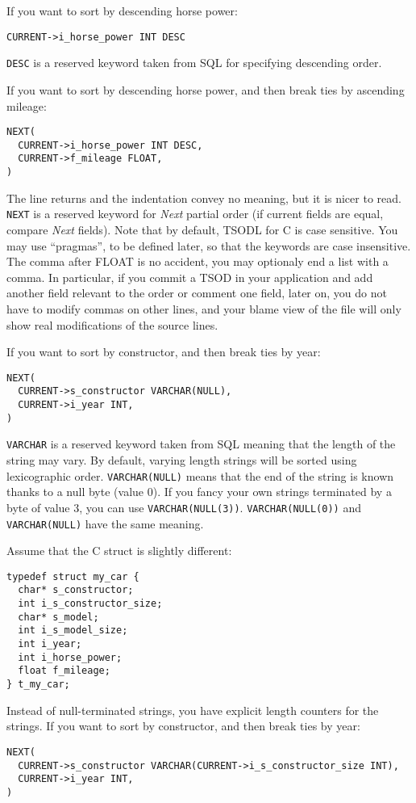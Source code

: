 \documentclass[a4paper,11pt]{report}
\begin{document}
If you want to sort by descending horse power:
\begin{verbatim}
CURRENT->i_horse_power INT DESC
\end{verbatim}
\verb?DESC? is a reserved keyword taken from SQL for specifying descending order.

If you want to sort by descending horse power, and then break ties by ascending mileage:
\begin{verbatim}
NEXT(
  CURRENT->i_horse_power INT DESC,
  CURRENT->f_mileage FLOAT,
)
\end{verbatim}
The line returns and the indentation convey no meaning,
but it is nicer to read.
\verb?NEXT? is a reserved keyword for \emph{Next} partial order (if current fields are equal, compare \emph{Next} fields).
Note that by default, TSODL for C is case sensitive.
You may use ``pragmas'', to be defined later, so that the keywords are case insensitive.
The comma after FLOAT is no accident, you may optionaly end a list with a comma.
In particular, if you commit a TSOD in your application and add another field
relevant to the order or comment one field, later on, you do not have to modify commas on other lines,
and your blame view of the file will only show real modifications of the source lines.

If you want to sort by constructor, and then break ties by year:
\begin{verbatim}
NEXT(
  CURRENT->s_constructor VARCHAR(NULL),
  CURRENT->i_year INT,
)
\end{verbatim}
\verb?VARCHAR? is a reserved keyword taken from SQL meaning that the length of the string may vary.
By default, varying length strings will be sorted using lexicographic order.
\verb?VARCHAR(NULL)? means that the end of the string is known thanks to a null byte (value 0).
If you fancy your own strings terminated by a byte of value 3, you can use \verb?VARCHAR(NULL(3))?.
\verb?VARCHAR(NULL(0))? and \verb?VARCHAR(NULL)? have the same meaning.

Assume that the C struct is slightly different:
\begin{verbatim}
typedef struct my_car {
  char* s_constructor;
  int i_s_constructor_size;
  char* s_model;
  int i_s_model_size;
  int i_year;
  int i_horse_power;
  float f_mileage;
} t_my_car;
\end{verbatim}
Instead of null-terminated strings, you have explicit length counters for the strings.
If you want to sort by constructor, and then break ties by year:
\begin{verbatim}
NEXT(
  CURRENT->s_constructor VARCHAR(CURRENT->i_s_constructor_size INT),
  CURRENT->i_year INT,
)
\end{verbatim}
\end{document}
